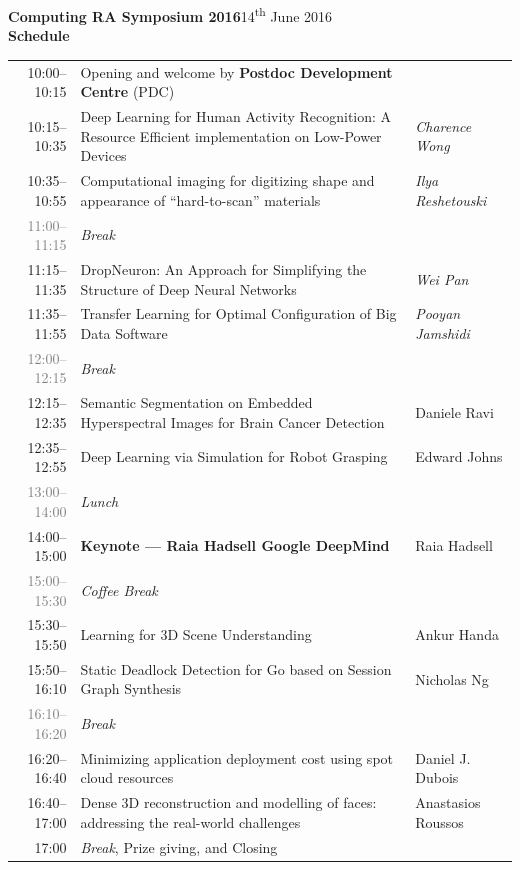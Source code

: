 \documentclass[11pt]{article}
\begin{document}
\textbf{\flushleft\Huge Computing RA Symposium 2016}\hfill{}14\textsuperscript{th} June 2016\\
\textbf{\flushleft\LARGE Schedule}\\[0.5cm]

\renewcommand{\arraystretch}{1.2}
\begin{tabular}{r@{\quad\color{icdarkblue}{\vline}\quad}p{10cm}@{\quad\color{gray!30}{\vline}\quad}l}
  10:00--10:15
  & Opening and welcome by \textbf{Postdoc Development Centre} (PDC)
  & \\
  10:15--10:35
  & Deep Learning for Human Activity Recognition: A Resource Efficient implementation on Low-Power Devices
  & \textit{Charence Wong}
  \\
  10:35--10:55
  & Computational imaging for digitizing shape and appearance of ``hard-to-scan'' materials
  & \textit{Ilya Reshetouski}
  \\[0.8cm]
  \textcolor{gray}{11:00--11:15}
  & \textit{Break}
  & \\[0.3cm]
  11:15--11:35
  & DropNeuron: An Approach for Simplifying the Structure of Deep Neural Networks
  & \textit{Wei Pan}\\
  11:35--11:55
  & Transfer Learning for Optimal Configuration of Big Data Software
  & \textit{Pooyan Jamshidi}\\[0.8cm]
  \textcolor{gray}{12:00--12:15}
  & \textit{Break}
  & \\[0.3cm]
  12:15--12:35
  & Semantic Segmentation on Embedded Hyperspectral Images for Brain Cancer Detection
  & Daniele Ravi\\
  12:35--12:55
  & Deep Learning via Simulation for Robot Grasping
  & Edward Johns\\[0.3cm]
  \textcolor{gray}{13:00--14:00}
  & \textit{Lunch}
  & \\[0.3cm]
  14:00--15:00
  & {\large\bf Keynote --- Raia Hadsell Google DeepMind}
  & Raia Hadsell\\
  \textcolor{gray}{15:00--15:30}
  & \textit{Coffee Break}
  & \\[0.3cm]
  15:30--15:50
  & Learning for 3D Scene Understanding
  & Ankur Handa\\
  15:50--16:10
  & Static Deadlock Detection for Go based on Session Graph Synthesis
  & Nicholas Ng \\[0.8cm]
  \textcolor{gray}{16:10--16:20}
  & \textit{Break}
  & \\[0.3cm]
  16:20--16:40
  & Minimizing application deployment cost using spot cloud resources
  & Daniel J. Dubois\\
  16:40--17:00
  & Dense 3D reconstruction and modelling of faces: addressing the real-world challenges
  & Anastasios Roussos \\[0.8cm]
  17:00
  & \textit{Break}, Prize giving, and Closing
  & \\
\end{tabular}
\end{document}

